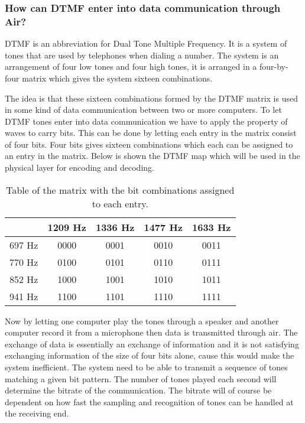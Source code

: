 		\subsubsection{How can DTMF enter into data communication through Air?}
		DTMF is an abbreviation for Dual Tone Multiple Frequency. It is a system of tones that are used by
		telephones when dialing a number. The system is an arrangement of four low tones and four high tones,
		it is arranged in a four-by-four matrix which gives the system sixteen combinations.
		
		The idea is that these sixteen combinations formed by the DTMF matrix is used in some kind of data
		communication between two or more computers. To let DTMF tones enter into data communication we have
		to apply the property of  waves to carry bits. This can be done by letting each entry in the matrix
		consist of four bits. Four bits gives sixteen combinations which each can be assigned to an entry in
		the matrix. Below is shown the DTMF map which will be used in the physical layer for encoding and decoding.
		
		\begin{table}[htb]
			\begin{center}
				\begin{tabular}{c|c c c c}
				 & 1209 Hz & 1336 Hz & 1477 Hz & 1633 Hz \\
				\hline
				697 Hz & 0000 & 0001 & 0010 & 0011 \\
				770 Hz & 0100 & 0101 & 0110 & 0111 \\
				852 Hz & 1000 & 1001 & 1010 & 1011 \\
				941 Hz & 1100 & 1101 & 1110 & 1111 \\
				\end{tabular}
			\end{center}
			\caption{Table of the matrix with the bit combinations assigned to each entry.}
			\label{tab:DTMF_mapping}
		\end{table}
		
		Now by letting one computer play the tones through a speaker and another computer record it from
		a microphone then data is transmitted through air. The exchange of data is essentially an exchange
		of information and it is not satisfying exchanging information of the size of four bits alone,
		cause this would make the system inefficient. The system need to be able to transmit a sequence
		of tones matching a given bit pattern. The number of tones played each second will determine the
		bitrate of the communication. The bitrate will of course be dependent on how fast the sampling and
		recognition of tones can be handled at the receiving end.
		
